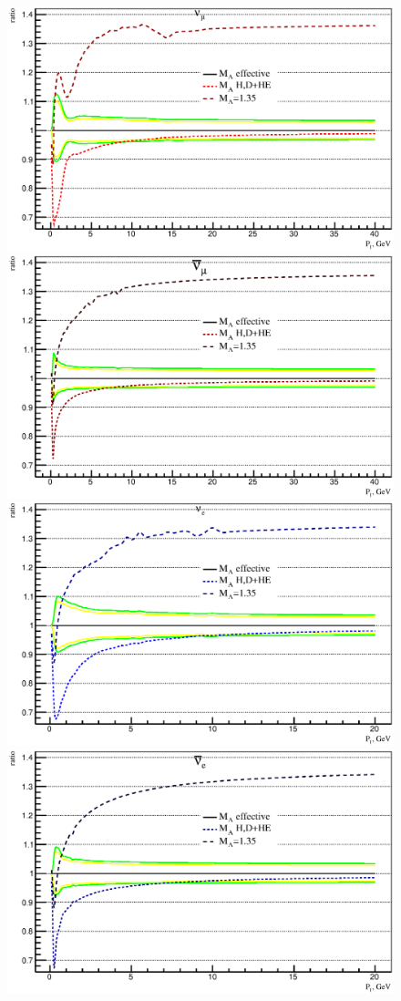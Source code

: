 \begin{figure}[htb!]
\begin{center}
\includegraphics[width=0.9\columnwidth]{./NOvA/NOvA_newflux_Scintillator_nm_n5.eps}
\includegraphics[width=0.9\columnwidth]{./NOvA/NOvA_newflux_Scintillator_am_n5.eps}
\includegraphics[width=0.9\columnwidth]{./NOvA/NOvA_newflux_Scintillator_ne_n5.eps}
\includegraphics[width=0.9\columnwidth]{./NOvA/NOvA_newflux_Scintillator_ae_n5.eps}

\end{center}
\end{figure}
